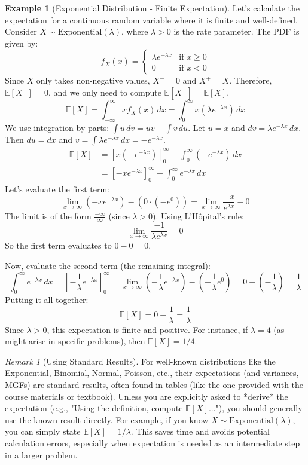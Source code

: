 \documentclass[11pt]{article}
\theoremstyle{definition}
\newtheorem{example}[theorem]{Example}
\theoremstyle{remark}
\newtheorem{remark}[theorem]{Remark}
\newcommand{\E}{\mathbb{E}}
\begin{document}
\begin{example}[Exponential Distribution - Finite Expectation]
Let's calculate the expectation for a continuous random variable where it is finite and well-defined. Consider $X \sim \text{Exponential}(\lambda)$, where $\lambda > 0$ is the rate parameter. The PDF is given by:
\[ f_X(x) = \begin{cases} \lambda e^{-\lambda x} & \text{if } x \ge 0 \\ 0 & \text{if } x < 0 \end{cases} \]
Since $X$ only takes non-negative values, $X^- = 0$ and $X^+ = X$. Therefore, $\E[X^-] = 0$, and we only need to compute $\E[X^+] = \E[X]$.
\[ \E[X] = \int_{-\infty}^{\infty} x f_X(x) \, dx = \int_0^{\infty} x (\lambda e^{-\lambda x}) \, dx \]
We use integration by parts: $\int u \, dv = uv - \int v \, du$. Let $u = x$ and $dv = \lambda e^{-\lambda x} \, dx$.
Then $du = dx$ and $v = \int \lambda e^{-\lambda x} \, dx = -e^{-\lambda x}$.
\[ \begin{aligned} \E[X] &= \left[ x (-e^{-\lambda x}) \right]_0^{\infty} - \int_0^{\infty} (-e^{-\lambda x}) \, dx \\ &= \left[ -x e^{-\lambda x} \right]_0^{\infty} + \int_0^{\infty} e^{-\lambda x} \, dx \end{aligned} \]
Let's evaluate the first term:
\[ \lim_{x \to \infty} (-x e^{-\lambda x}) - (0 \cdot (-e^0)) = \lim_{x \to \infty} \frac{-x}{e^{\lambda x}} - 0 \]
The limit is of the form $\frac{-\infty}{\infty}$ (since $\lambda > 0$). Using L'Hôpital's rule:
\[ \lim_{x \to \infty} \frac{-1}{\lambda e^{\lambda x}} = 0 \]
So the first term evaluates to $0 - 0 = 0$.

Now, evaluate the second term (the remaining integral):
\[ \int_0^{\infty} e^{-\lambda x} \, dx = \left[ -\frac{1}{\lambda} e^{-\lambda x} \right]_0^{\infty} = \lim_{x \to \infty} \left(-\frac{1}{\lambda} e^{-\lambda x}\right) - \left(-\frac{1}{\lambda} e^0\right) = 0 - \left(-\frac{1}{\lambda}\right) = \frac{1}{\lambda} \]
Putting it all together:
\[ \E[X] = 0 + \frac{1}{\lambda} = \frac{1}{\lambda} \]
Since $\lambda > 0$, this expectation is finite and positive. For instance, if $\lambda = 4$ (as might arise in specific problems), then $\E[X] = 1/4$.
\end{example}

\begin{remark}[Using Standard Results]
For well-known distributions like the Exponential, Binomial, Normal, Poisson, etc., their expectations (and variances, MGFs) are standard results, often found in tables (like the one provided with the course materials or textbook). Unless you are explicitly asked to *derive* the expectation (e.g., "Using the definition, compute $\E[X]$..."), you should generally use the known result directly. For example, if you know $X \sim \text{Exponential}(\lambda)$, you can simply state $\E[X] = 1/\lambda$. This saves time and avoids potential calculation errors, especially when expectation is needed as an intermediate step in a larger problem.
\end{remark}
\end{document}

